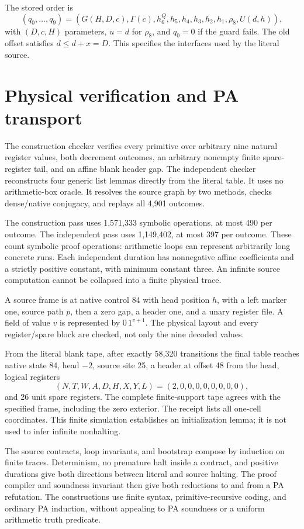 \documentclass[10pt,letterpaper]{article}
\begin{document}
The stored order is
\[
 (q_0,\ldots,q_9)=
 (G(H,D,c),\Gamma(c),h_6^Q,h_5,h_4,h_3,h_2,h_1,\rho_8,U(d,h)),
\]
with $(D,c,H)$ parameters, $u=d$ for $\rho_8$, and $q_0=0$ if the
guard fails. The old offset satisfies $d\le d+x=D$.
This specifies the interfaces used by the literal source.



\section{Physical verification and PA transport}
\label{sec:verification}

The construction checker verifies every primitive over arbitrary nine
natural register values, both decrement outcomes, an arbitrary nonempty
finite spare-register tail, and an affine blank header gap.
The independent checker reconstructs four generic list lemmas directly
from the literal table. It uses no arithmetic-box oracle. It resolves
the source graph by two methods, checks dense/native conjugacy,
and replays all 4,901 outcomes.

The construction pass uses 1,571,333 symbolic operations, at most 490 per
outcome. The independent pass uses 1,149,402, at most 397 per outcome.
These count symbolic proof operations: arithmetic loops can represent
arbitrarily long concrete runs. Each independent duration has
nonnegative affine coefficients and a strictly positive constant, with
minimum constant three. An infinite source computation cannot be
collapsed into a finite physical trace.

A source frame is at native control 84 with head position $h$, with a
left marker one, source path $p$, then a zero gap, a header one, and a
unary register file. A field of value $v$ is represented by $0\,1^{v+1}$.
The physical layout and every register/spare block are checked,
not only the nine decoded values.

From the literal blank tape, after exactly 58,320 transitions the final
table reaches native state 84, head $-2$, source site 25, a header at
offset 48 from the head, logical registers
\[
          (N,T,W,A,D,H,X,Y,L)=(2,0,0,0,0,0,0,0,0),
\]
and 26 unit spare registers. The complete finite-support tape agrees with
the specified frame, including the zero exterior. The receipt lists all
one-cell coordinates. This finite simulation establishes an initialization
lemma; it is not used to infer infinite nonhalting.

The source contracts, loop invariants, and bootstrap compose by induction
on finite traces. Determinism, no premature halt inside a contract, and
positive durations give both directions between literal and source
halting. The proof compiler and soundness invariant then give both
reductions to and from a PA refutation. The constructions use finite
syntax, primitive-recursive coding, and ordinary PA induction, without
appealing to PA soundness or a uniform arithmetic truth predicate.
\end{document}
